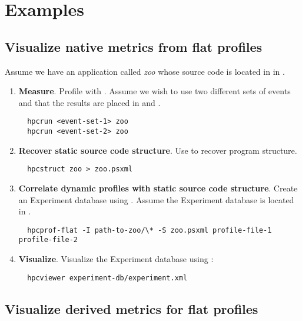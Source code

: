 \documentclass[english]{article}
\begin{document}
\section{Examples}

\subsection{Visualize native metrics from flat profiles}

Assume we have an application called \emph{zoo} whose source code is located in in .

\begin{enumerate}
\item \textbf{Measure}.  Profile with .  Assume we wish to use two different sets of events and that the results are placed in  and .
\begin{verbatim}
  hpcrun <event-set-1> zoo
  hpcrun <event-set-2> zoo
\end{verbatim}

\item \textbf{Recover static source code structure}. Use  to recover program structure.
\begin{verbatim}
  hpcstruct zoo > zoo.psxml
\end{verbatim}

\item \textbf{Correlate dynamic profiles with static source code structure}.
Create an Experiment database using .  Assume the Experiment database is located in .
\begin{verbatim}
  hpcprof-flat -I path-to-zoo/\* -S zoo.psxml profile-file-1 profile-file-2
\end{verbatim}

\item \textbf{Visualize}.
Visualize the Experiment database using :
\begin{verbatim}
  hpcviewer experiment-db/experiment.xml
\end{verbatim}

\end{enumerate}

\subsection{Visualize derived metrics for flat profiles}
\end{document}
